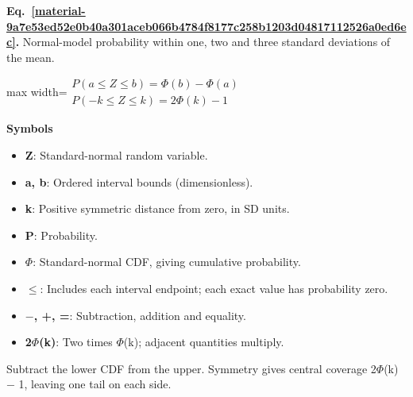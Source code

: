 \documentclass[11pt,a4paper]{article}
\begin{document}
\par\medskip
\noindent\begin{minipage}{\linewidth}
\label{material-9a7e53ed52e0b40a301aceb066b4784f8177c258b1203d04817112526a0ed6ec}
\noindent\textbf{Eq.~\ref*{material-9a7e53ed52e0b40a301aceb066b4784f8177c258b1203d04817112526a0ed6ec}.} Normal-model probability within one, two and three standard deviations of the mean.\par\nopagebreak
\begin{center}\begin{adjustbox}{max width=\linewidth}$\displaystyle \begin{gathered}P(a\le Z\le b)=\Phi(b)-\Phi(a)\\P(-k\le Z\le k)=2\Phi(k)-1\end{gathered}$\end{adjustbox}\end{center}

\par\noindent\textbf{Symbols}

\begin{itemize}\setlength{\itemsep}{1pt}\setlength{\parsep}{0pt}
\item \textbf{Z}: Standard-normal random variable.
\item \textbf{a, b}: Ordered interval bounds (dimensionless).
\item \textbf{k}: Positive symmetric distance from zero, in SD units.
\item \textbf{P}: Probability.
\item \textbf{\ensuremath{\Phi}}: Standard-normal CDF, giving cumulative probability.
\item \textbf{\ensuremath{\le}}: Includes each interval endpoint; each exact value has probability zero.
\item \textbf{\ensuremath{-}, +, =}: Subtraction, addition and equality.
\item \textbf{2\ensuremath{\Phi}(k)}: Two times \ensuremath{\Phi}(k); adjacent quantities multiply.
\end{itemize}

Subtract the lower CDF from the upper. Symmetry gives central coverage 2\ensuremath{\Phi}(k) \ensuremath{-} 1, leaving one tail on each side.

\end{minipage}\par
\medskip
\end{document}
